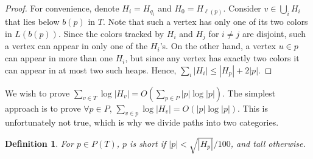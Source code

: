\documentclass[11pt]{article}
\newcommand{\ignore}[1]{}
\newtheorem{definition}[theorem]{Definition}
\theoremstyle{definition}
\newtheorem{observation}{Observation}
\begin{document}
\begin{proof} For convenience, denote $H_i = H_{q_i}$ and $H_0 = H_{\ell(p)}$.
Consider $v \in \bigcup_{i} H_i$ that lies below $b(p)$ in $T$. 
Note that such a vertex has only one of its two colors in $L(b(p))$.  
Since the colors tracked by $H_i$ and $H_j$ for $i\neq j$ are disjoint, 
such a vertex can appear in only one of the $H_i$'s.
On the other hand, a vertex $u\in p$ can appear in more than one $H_i$, 
but since any vertex has exactly two colors it can appear in at most two 
such heaps.  Hence, $\sum_i |H_i| \leq |H_p| + 2|p|$.
\ignore{
 First observe that for all $i$, $r_{i}$ lies above $r_p$ on some root to leaf path. 
 Let $H_i'$ be the subset of $H_i$ that lies below $r_p$.  Observe that $H_i'\subseteq H_p$, as $L(T_{r_i})\subseteq L(T_{r_p})$.
  
 Now for any $i\neq j$, $H_i \cap H_j = \emptyset$, as $r_{i}$ and $r_{j}$ are not on the same root to leaf path (i.e. $L(T_{r_i}) \cap L(T_{r_j}) = \emptyset$).
 In particular, $(H_i\setminus H_i') \cap (H_j \setminus H_j') = \emptyset$, and so $\sum_{i=0}^k |H_i\setminus H_i'| \leq |p|$ 
 as $H_i\setminus H_i'$ is precisely the subset of $H_i$ that lies on $p$.
 Moreover, for any $i\neq j$, $ H_i' \cap H_j' = \emptyset$, and so since $H_i'\subseteq H_p$ we have $\sum_{i=0}^k |H_i'|\leq |H_p|$.
 Putting these together gives
 \[
  \sum_{i=0}^k |H_i| = \sum_{i=0}^k |H_i'| + \sum_{i=0}^k |H_i\setminus H_i'| \leq |H_p|+|p|.
 \]
}
\end{proof}



We wish to prove $\sum_{v\in T} \log |H_v| = O(\sum_{p\in P} |p| \log |p|)$. 
The simplest approach is to prove $\forall p\in P$, $\sum_{v\in p} \log |H_v|= O(|p|\log|p|)$.
This is unfortunately not true, which is why we divide paths into two categories.

\begin{definition}
 For $p\in P(T)$, $p$ is \emph{short} if $|p| < \sqrt{|H_{p}|}/100$, and \emph{tall} otherwise.
\end{definition}

\ignore{
\begin{observation}
\label{obs:decrease}
 Let $v$ be a vertex in $T$ and let $w$ be its parent.  Then $|H_w| \geq |H_v| -1$, as $L(T_v) \subseteq L(T_w)$ and the path from 
 $w$ to the root has one less vertex than the path from $v$ to the root.
 In particular, we have the following more general property.
 Let $v$ and $u$ be any two vertices in the same root to leaf path of $T$, such that $v$ is a descendant of $u$.  
 Then $|H_v| \leq |H_u| + d(u,v)$. 
\end{observation}

The following can be thought of as a generalization of the above observation, and will be useful in later sections.
}
\end{document}

